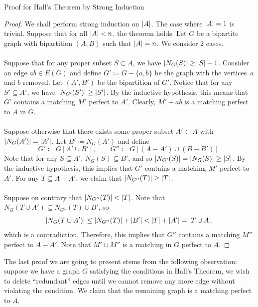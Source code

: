 \documentclass[math]{amznotes}
\theoremstyle{remark}
\begin{document}
\begin{genbox}{Proof for Hall's Theorem by Strong Induction}
    \begin{proof}
        We shall perform strong induction on ${\left\lvert {A} \right\rvert}$. The case where ${\left\lvert {A} \right\rvert} = 1$ is trivial. Suppose that for all ${\left\lvert {A} \right\rvert} < n$, the theorem holds. Let $G$ be a bipartite graph with bipartition $(A, B)$ such that ${\left\lvert {A} \right\rvert} = n$. We consider $2$ cases.
        \\\\
        Suppose that for any proper subset $S \subset A$, we have ${\left\lvert {N_G(S)} \right\rvert} \geq {\left\lvert {S} \right\rvert} + 1$. Consider an edge $ab \in E(G)$ and define $G' \coloneqq G - \{a, b\}$ be the graph with the vertices~$a$ and $b$ removed. Let $(A', B')$ be the bipartition of $G'$. Notice that for any $S' \subseteq A'$, we have ${\left\lvert {N_{G'}(S')} \right\rvert} \geq {\left\lvert {S'} \right\rvert}$. By the inductive hypothesis, this means that $G'$ contains a matching $M'$ perfect to $A'$. Clearly, $M' + ab$ is a matching perfect to $A$ in $G$.
        \\\\
        Suppose otherwise that there exists some proper subset $A' \subset A$ with ${\left\lvert {N_G(A')} \right\rvert} = {\left\lvert {A'} \right\rvert}$. Let $B' \coloneqq N_G(A')$ and define
        \begin{equation*}
            G' \coloneqq G[A' \cup B'], \qquad G'' \coloneqq G[(A - A') \cup (B - B')].
        \end{equation*}
        Note that for any $S \subseteq A'$, $N_{G}(S) \subseteq B'$, and so ${\left\lvert {N_{G'}(S)} \right\rvert} = {\left\lvert {N_G(S)} \right\rvert} \geq {\left\lvert {S} \right\rvert}$. By the inductive hypothesis, this implies that $G'$ contains a matching $M'$ perfect to $A'$. For any $T \subseteq A - A'$, we claim that ${\left\lvert {N_{G''}(T)} \right\rvert} \geq {\left\lvert {T} \right\rvert}$.
        \\\\
        Suppose on contrary that ${\left\lvert {N_{G''}(T)} \right\rvert} < {\left\lvert {T} \right\rvert}$. Note that $N_G(T \cup A') \subseteq N_{G''}(T) \cup B'$, so
        \begin{equation*}
            {\left\lvert {N_G(T \cup A')} \right\rvert} \leq {\left\lvert {N_{G''}(T)} \right\rvert} + {\left\lvert {B'} \right\rvert} < {\left\lvert {T} \right\rvert} + {\left\lvert {A'} \right\rvert} = {\left\lvert {T \cup A} \right\rvert},
        \end{equation*}
        which is a contradiction. Therefore, this implies that $G''$ contains a matching $M''$ perfect to $A - A'$. Note that $M' \cup M''$ is a matching in $G$ perfect to $A$.
    \end{proof}
\end{genbox}
The last proof we are going to present stems from the following observation: suppose we have a graph $G$ satisfying the conditions in Hall's Theorem, we wish to delete ``redundant'' edges until we cannot remove any more edge without violating the condition. We claim that the remaining graph is a matching perfect to $A$.
\end{document}
